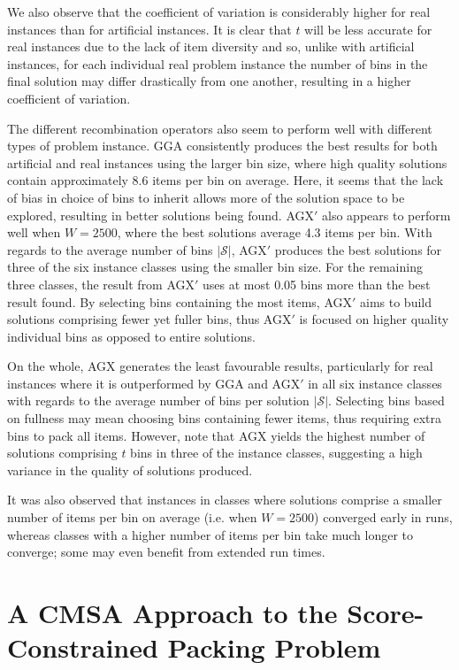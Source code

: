 \documentclass[a4paper,11pt,authoryear]{elsarticle}
\begin{document}
We also observe that the coefficient of variation is considerably higher for real instances than for artificial instances. It is clear that $t$ will be less accurate for real instances due to the lack of item diversity and so, unlike with artificial instances, for each individual real problem instance the number of bins in the final solution may differ drastically from one another, resulting in a higher coefficient of variation.

The different recombination operators also seem to perform well with different types of problem instance. GGA consistently produces the best results for both artificial and real instances using the larger bin size, where high quality solutions contain approximately 8.6 items per bin on average. Here, it seems that the lack of bias in choice of bins to inherit allows more of the solution space to be explored, resulting in better solutions being found. AGX$'$ also appears to perform well when $W=2500$, where the best solutions average 4.3 items per bin. With regards to the average number of bins $|\mathcal{S}|$, AGX$'$ produces the best solutions for three of the six instance classes using the smaller bin size. For the remaining three classes, the result from AGX$'$ uses at most 0.05 bins more than the best result found. By selecting bins containing the most items, AGX$'$ aims to build solutions comprising fewer yet fuller bins, thus AGX$'$ is focused on higher quality individual bins as opposed to entire solutions.

On the whole, AGX generates the least favourable results, particularly for real instances where it is outperformed by GGA and AGX$'$ in all six instance classes with regards to the average number of bins per solution $|\mathcal{S}|$. Selecting bins based on fullness may mean choosing bins containing fewer items, thus requiring extra bins to pack all items. However, note that AGX yields the highest number of solutions comprising $t$ bins in three of the instance classes, suggesting a high variance in the quality of solutions produced.

It was also observed that instances in classes where solutions comprise a smaller number of items per bin on average (i.e. when $W=2500$) converged early in runs, whereas classes with a higher number of items per bin take much longer to converge; some may even benefit from extended run times.

\section{A CMSA Approach to the Score-Constrained Packing Problem}
\label{sec:cmsa}
\end{document}
